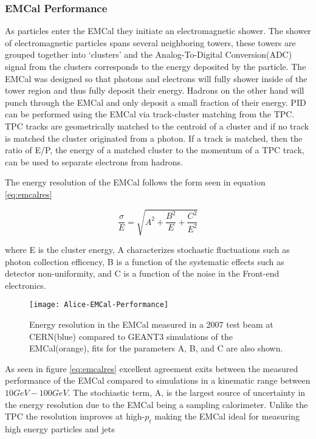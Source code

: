 \subsubsection{EMCal Performance}
As particles enter the EMCal they initiate an electromagnetic shower.  The shower of electromagnetic particles spans several neighboring towers, these towers are grouped together into `clusters' and the Analog-To-Digital Conversion(ADC) signal from the clusters corresponds to the energy deposited by the particle.  The EMCal was designed so that photons and electrons will fully shower inside of the tower region and thus fully deposit their energy.  Hadrons on the other hand  will punch through the EMCal and only deposit a small fraction of their energy.  PID can be performed using the EMCal via track-cluster matching from the TPC.  TPC tracks are geometrically matched to the centroid of a cluster and if no track is matched the cluster originated from a photon. If a track is matched, then the ratio of E/P, the energy of a matched cluster to the momentum of a TPC track, can be used to separate electrons from hadrons.

The energy resolution of the EMCal follows the form seen in equation \ref{eq:emcalres}



\begin{equation}
\frac{\sigma}{E} = \sqrt{ A^{2} + \frac{B^{2}}{E} + \frac{C^{2}}{E^{2}}  }
\label{eq:emcalres}
\end{equation}

\noindent
where E is the cluster energy, A characterizes stochastic fluctuations such as photon collection efficency, B is a function of the systematic effects such as detector non-uniformity, and C is a function of the noise in the Front-end electronics. 

\begin{figure}[h]
\texttt{[image: Alice-EMCal-Performance]}
\centering
\caption{Energy resolution in the EMCal measured in a 2007 test beam at CERN(blue) compared to GEANT3 simulations of the EMCal(orange), fits for the parameters A, B, and C are also shown\cite{Abeysekara:2010ze}.}
\label{fig:EMCalres}
\end{figure}

As seen in figure \ref{eq:emcalres} excellent agreement exits between the measured performance of the EMCal compared to simulations in a kinematic range between $10 GeV - 100 GeV$.  The stochiastic term, A, is the largest source of uncertainty in the energy resolution due to the EMCal being a sampling calorimeter.  Unlike the TPC the resolution improves at high-$p_{t}$ making the EMCal ideal for measuring high energy particles and jets





